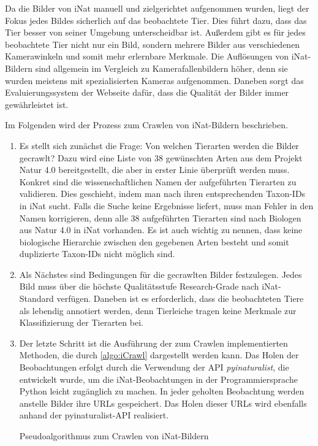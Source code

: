 Da die Bilder von iNat manuell und zielgerichtet aufgenommen wurden, liegt der Fokus jedes Bildes sicherlich auf das beobachtete Tier. Dies führt dazu, dass das Tier besser von seiner Umgebung unterscheidbar ist. Außerdem gibt es für jedes beobachtete Tier nicht nur ein Bild, sondern mehrere Bilder aus verschiedenen Kamerawinkeln und somit mehr erlernbare Merkmale. Die Auflösungen von iNat-Bildern sind allgemein im Vergleich zu Kamerafallenbildern höher, denn sie wurden meistens mit spezialisierten Kameras aufgenommen. Daneben sorgt das Evaluierungssystem der Webseite dafür, dass die Qualität der Bilder immer gewährleistet ist.

Im Folgenden wird der Prozess zum Crawlen von iNat-Bildern beschrieben.

\begin{enumerate}
	\item Es stellt sich zunächst die Frage: Von welchen Tierarten werden die Bilder gecrawlt? Dazu wird eine Liste von 38 gewünschten Arten aus dem Projekt Natur 4.0 bereitgestellt, die aber in erster Linie überprüft werden muss. Konkret sind die wissenschaftlichen Namen der aufgeführten Tierarten zu validieren. Dies geschieht, indem man nach ihren entsprechenden Taxon-IDs in iNat sucht. Falls die Suche keine Ergebnisse liefert, muss man Fehler in den Namen korrigieren, denn alle 38 aufgeführten Tierarten sind nach Biologen aus Natur 4.0 in iNat vorhanden. Es ist auch wichtig zu nennen, dass keine biologische Hierarchie zwischen den gegebenen Arten besteht und somit duplizierte Taxon-IDs nicht möglich sind.
	
	\item Als Nächstes sind Bedingungen für die gecrawlten Bilder festzulegen. Jedes Bild muss über die höchste Qualitätsstufe Research-Grade nach iNat-Standard verfügen. Daneben ist es erforderlich, dass die beobachteten Tiere als lebendig annotiert werden, denn Tierleiche tragen keine Merkmale zur Klassifizierung der Tierarten bei.
	
	\item Der letzte Schritt ist die Ausführung der zum Crawlen implementierten Methoden, die durch \autoref{algo:iCrawl} dargestellt werden kann. Das Holen der Beobachtungen erfolgt durch die Verwendung der API \emph{pyinaturalist}, die entwickelt wurde, um die iNat-Beobachtungen in der Programmiersprache Python leicht zugänglich zu machen. In jeder geholten Beobachtung werden anstelle Bilder ihre URLs gespeichert. Das Holen dieser URLs wird ebenfalls anhand der pyinaturalist-API realisiert.
	\begin{algorithm}[h] 
		\caption{Pseudoalgorithmus zum Crawlen von iNat-Bildern}
		\SetAlgoLined 
		\label{algo:iCrawl}
	\end{algorithm}


\end{enumerate}
